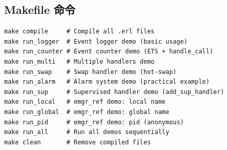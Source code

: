 \documentclass[a4paper,11pt]{article}
\begin{document}
\subsection{Makefile 命令}

\begin{lstlisting}[style=shellstyle, caption={src/Makefile 可用命令}]
make compile     # Compile all .erl files
make run_logger  # Event logger demo (basic usage)
make run_counter # Event counter demo (ETS + handle_call)
make run_multi   # Multiple handlers demo
make run_swap    # Swap handler demo (hot-swap)
make run_alarm   # Alarm system demo (practical example)
make run_sup     # Supervised handler demo (add_sup_handler)
make run_local   # emgr_ref demo: local name
make run_global  # emgr_ref demo: global name
make run_pid     # emgr_ref demo: pid (anonymous)
make run_all     # Run all demos sequentially
make clean       # Remove compiled files
\end{lstlisting}
\end{document}
